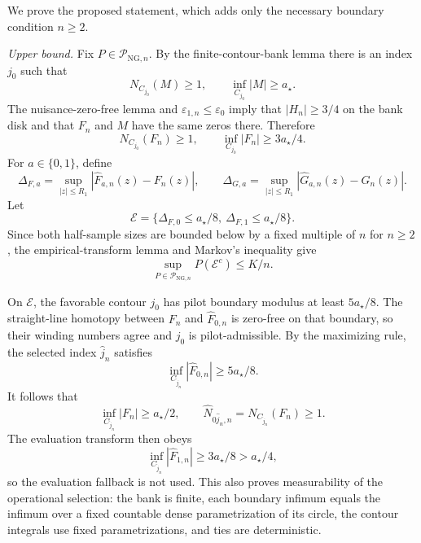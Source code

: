 We prove the proposed statement, which adds only the necessary boundary condition \(n\ge2\).

\emph{Upper bound.}
Fix \(P\in\mathcal P_{\mathrm{NG},n}\).  By the finite-contour-bank lemma there is an index \(j_0\) such that
\[
 N_{C_{j_0}}(M)\ge1,
 \qquad
 \inf_{C_{j_0}}|M|\ge a_{\star}.
\]
The nuisance-zero-free lemma and \(\varepsilon_{1,n}\le\varepsilon_0\) imply that \(|H_n|\ge3/4\) on the bank disk and that \(F_n\) and \(M\) have the same zeros there.  Therefore
\[
 N_{C_{j_0}}(F_n)\ge1,
 \qquad
 \inf_{C_{j_0}}|F_n|\ge3a_{\star}/4.
\]
For \(a\in\{0,1\}\), define
\[
 \Delta_{F,a}=\sup_{|z|\le R_1}|\widehat F_{a,n}(z)-F_n(z)|,
 \qquad
 \Delta_{G,a}=\sup_{|z|\le R_1}|\widehat G_{a,n}(z)-G_n(z)|.
\]
Let
\[
 \mathcal E=\{\Delta_{F,0}\le a_{\star}/8,\ \Delta_{F,1}\le a_{\star}/8\}.
\]
Since both half-sample sizes are bounded below by a fixed multiple of \(n\) for \(n\ge2\), the empirical-transform lemma and Markov's inequality give
\[
 \sup_{P\in\mathcal P_{\mathrm{NG},n}}P(\mathcal E^c)\le K/n.
\]

On \(\mathcal E\), the favorable contour \(j_0\) has pilot boundary modulus at least \(5a_{\star}/8\).  The straight-line homotopy between \(F_n\) and \(\widehat F_{0,n}\) is zero-free on that boundary, so their winding numbers agree and \(j_0\) is pilot-admissible.  By the maximizing rule, the selected index \(\widehat j_n\) satisfies
\[
 \inf_{C_{\widehat j_n}}|\widehat F_{0,n}|
 \ge5a_{\star}/8.
\]
It follows that
\[
 \inf_{C_{\widehat j_n}}|F_n|\ge a_{\star}/2,
 \qquad
 \widehat N_{0\widehat j_n,n}=N_{C_{\widehat j_n}}(F_n)\ge1.
\]
The evaluation transform then obeys
\[
 \inf_{C_{\widehat j_n}}|\widehat F_{1,n}|
 \ge3a_{\star}/8>a_{\star}/4,
\]
so the evaluation fallback is not used.  This also proves measurability of the operational selection: the bank is finite, each boundary infimum equals the infimum over a fixed countable dense parametrization of its circle, the contour integrals use fixed parametrizations, and ties are deterministic.

